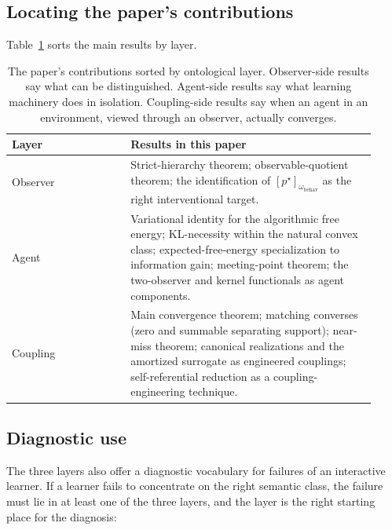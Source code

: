 \subsection{Locating the paper's contributions}
\label{sec:ontology-locator}

Table~\ref{tab:ontology} sorts the main results by layer.

\begin{table}[h]
\centering\small
\begin{tabular}{p{0.30\linewidth}p{0.62\linewidth}}
\toprule
Layer & Results in this paper \\
\midrule
Observer & Strict-hierarchy theorem; observable-quotient theorem; the identification of $[p^\star]_{\omega_{\mathrm{behav}}}$ as the right interventional target. \\
Agent & Variational identity for the algorithmic free energy; KL-necessity within the natural convex class; expected-free-energy specialization to information gain; meeting-point theorem; the two-observer and kernel functionals as agent components. \\
Coupling & Main convergence theorem; matching converses (zero and summable separating support); near-miss theorem; canonical realizations and the amortized surrogate as engineered couplings; self-referential reduction as a coupling-engineering technique. \\
\bottomrule
\end{tabular}
\caption{The paper's contributions sorted by ontological layer. Observer-side results say what can be distinguished. Agent-side results say what learning machinery does in isolation. Coupling-side results say when an agent in an environment, viewed through an observer, actually converges.}
\label{tab:ontology}
\end{table}

\subsection{Diagnostic use}
\label{sec:ontology-diagnostic}

The three layers also offer a diagnostic vocabulary for failures of an interactive learner. If a learner fails to concentrate on the right semantic class, the failure must lie in at least one of the three layers, and the layer is the right starting place for the diagnosis:

